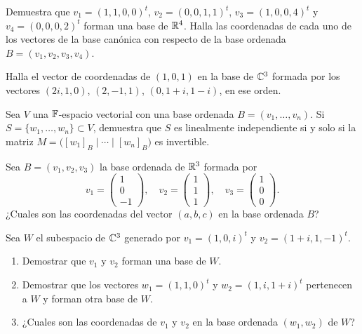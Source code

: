 \ExerciseSection

\begin{exerciselist}
  \item Demuestra que $v_1 = (1, 1, 0, 0)^t$, $v_2 = (0, 0, 1, 1)^t$, $v_3 = (1, 0, 0, 4)^t$ y $v_4 = (0, 0, 0, 2)^t$ forman una base de $\mathbb{R}^4$. Halla las coordenadas de cada uno de los vectores de la base canónica con respecto de la base ordenada $B = (v_1, v_2, v_3, v_4)$.
  
  \item Halla el vector de coordenadas de $(1, 0, 1)$ en la base de $\mathbb{C}^3$ formada por los vectores $(2i, 1, 0)$, $(2, -1, 1)$, $(0, 1+i, 1-i)$, en ese orden.
  
  \item Sea $V$ una $\mathbb{F}$-espacio vectorial con una base ordenada $B = (v_1, \ldots, v_n)$. Si $S = \{w_1, \ldots, w_n\} \subset V$, demuestra que $S$ es linealmente independiente si y solo si la matriz $M = \bigl( [w_1]_B \mid \cdots \mid [w_n]_B\bigr)$ es invertible.
  
  \item Sea $B = (v_1, v_2, v_3)$ la base ordenada de $\mathbb{R}^3$ formada por
    \[ 
      v_1 = \begin{pmatrix} 1 \\ 0 \\ -1 \end{pmatrix}, \quad
      v_2 = \begin{pmatrix} 1 \\ 1 \\ 1 \end{pmatrix}, \quad
      v_3 = \begin{pmatrix} 1 \\ 0 \\ 0 \end{pmatrix}.
    \]
    ¿Cuales son las coordenadas del vector $(a,b,c)$ en la base ordenada $B$?

  \item Sea $W$ el subespacio de $\mathbb{C}^3$ generado por $v_1 = (1, 0, i)^t$ y $v_2 = (1+i, 1, -1)^t$.
    \begin{enumerate}
      \item Demostrar que $v_1$ y $v_2$ forman una base de $W$.
      \item Demostrar que los vectores $w_1 = (1, 1, 0)^t$ y $w_2 = (1, i, 1+i)^t$ pertenecen a $W$ y forman otra base de $W$.
      \item ¿Cuales son las coordenadas de $v_1$ y $v_2$ en la base ordenada $(w_1, w_2)$ de $W$?
    \end{enumerate}
  

\end{exerciselist}
